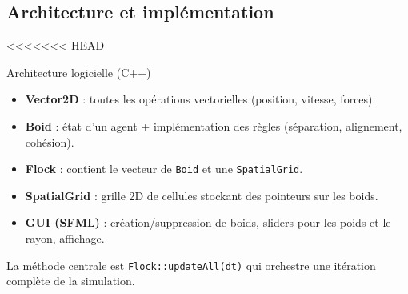 \documentclass[aspectratio=169]{beamer}
\begin{document}
\subsection{Architecture et implémentation}

<<<<<<< HEAD
\begin{frame}{Architecture logicielle (C++)}
  \begin{itemize}
    \item \textbf{Vector2D} : toutes les opérations vectorielles (position, vitesse, forces).
    \item \textbf{Boid} : état d’un agent + implémentation des règles (séparation, alignement, cohésion).
    \item \textbf{Flock} : contient le vecteur de \texttt{Boid} et une \texttt{SpatialGrid}.
    \item \textbf{SpatialGrid} : grille 2D de cellules stockant des pointeurs sur les boids.
    \item \textbf{GUI (SFML)} : création/suppression de boids, sliders pour les poids et le rayon, affichage.
  \end{itemize}
  \vspace{0.1cm}
  La méthode centrale est \texttt{Flock::updateAll(dt)} qui orchestre une itération complète de la simulation.
\end{frame}


% 
\end{document}

